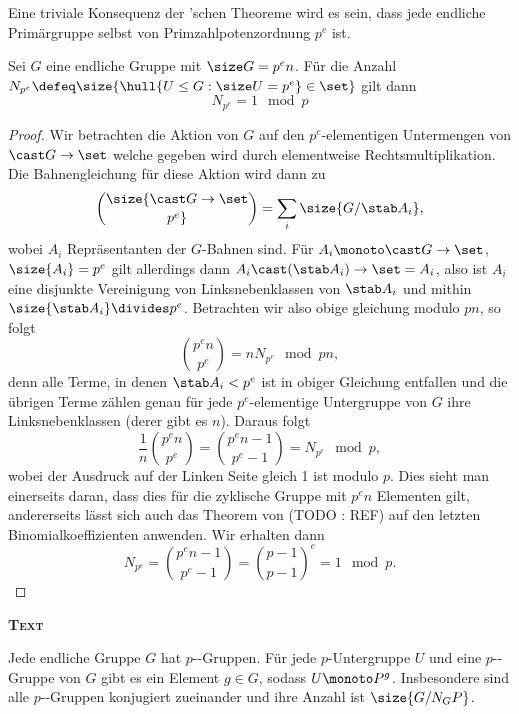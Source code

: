 \begin{remark}
    Eine triviale Konsequenz der 'schen Theoreme wird es sein, dass jede endliche Primärgruppe selbst von
    Primzahlpotenzordnung $p^e$ ist.
\end{remark}
%
\begin{theorem}
    Sei $G$ eine endliche Gruppe mit $\size G = p^e n$. Für die Anzahl $N_{p^e}\defeq \size{\hull{U\leq G:\size U=p^e}\in\set}$ gilt dann
    $$
    N_{p^e} = 1 \mod p
    $$
\end{theorem}
%
\begin{proof}
    Wir betrachten die Aktion von $G$ auf den $p^e$-elementigen Untermengen von $\cast G \to \set$ welche gegeben wird durch
    elementweise Rechtsmultiplikation. Die Bahnengleichung für diese Aktion wird dann zu
    $$
    \size {{\cast G \to \set} \choose {p^e}} = \sum_i {\size {G/\stab A_i}},
    $$
    wobei $A_i$ Repräsentanten der $G$-Bahnen sind.
    Für $A_i\monoto \cast G \to \set$, $\size {A_i}=p^e$ gilt allerdings dann $A_i \cast (\stab A_i) \to \set=A_i$, also ist $A_i$ eine disjunkte
    Vereinigung von Linksnebenklassen von $\stab A_i$ und mithin $\size {\stab A_i}\divides p^e$. Betrachten wir also obige
    gleichung modulo $pn$, so folgt
    $$
    {{p^e n} \choose {p^e}} = n N_{p^e} \mod pn, 
    $$
    denn alle Terme, in denen $\stab A_i<p^e$ ist in obiger Gleichung entfallen und die übrigen Terme zählen genau für jede
    $p^e$-elementige Untergruppe von $G$ ihre Linksnebenklassen (derer gibt es $n$).
    Daraus folgt
    $$
    \frac 1 n {{p^e n} \choose {p^e}} = {{p^e n-1} \choose {p^e-1}} = N_{p^e} \mod p,
    $$
    wobei der Ausdruck auf der Linken Seite gleich 1 ist modulo $p$. Dies sieht man einerseits daran, dass dies für die zyklische
    Gruppe mit $p^e n$ Elementen gilt, andererseits lässt sich auch das Theorem von  (TODO : REF) auf den letzten
    Binomialkoeffizienten anwenden. Wir erhalten dann
    $$
    N_{p^e} = {{p^e n - 1} \choose {p^e -1}} = {{p-1} \choose {p-1}}^e = 1 \mod p.
    $$
\end{proof}

{\bfseries\scshape Text}

\begin{theorem}
    Jede endliche Gruppe $G$ hat $p$--Gruppen. Für jede $p$-Untergruppe $U$ und eine $p$--Gruppe von
    $G$ gibt es ein Element $g\in G$, sodass $U\monoto P^g$. Insbesondere sind alle $p$--Gruppen konjugiert zueinander
    und ihre Anzahl ist $\size {G/N_G P}$. 
\end{theorem}

